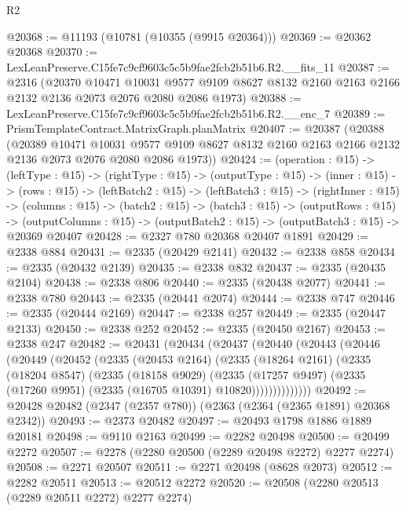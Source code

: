 \begin{lexlean}{R2}
\begin{coremodule}
@20368 := @11193 (@10781 (@10355 (@9915 @20364)))
@20369 := @20362 @20368
@20370 := LexLeanPreserve.C15fe7c9cf9603c5c5b9fae2fcb2b51b6.R2.__fits_11
@20387 := @2316
    (@20370
      @10471
      @10031
      @9577
      @9109
      @8627
      @8132
      @2160
      @2163
      @2166
      @2132
      @2136
      @2073
      @2076
      @2080
      @2086
      @1973)
@20388 := LexLeanPreserve.C15fe7c9cf9603c5c5b9fae2fcb2b51b6.R2.__enc_7
@20389 := PrismTemplateContract.MatrixGraph.planMatrix
@20407 := @20387
    (@20388
      (@20389
        @10471
        @10031
        @9577
        @9109
        @8627
        @8132
        @2160
        @2163
        @2166
        @2132
        @2136
        @2073
        @2076
        @2080
        @2086
        @1973))
@20424 := (operation : @15) ->
  (leftType : @15) ->
  (rightType : @15) ->
  (outputType : @15) ->
  (inner : @15) ->
  (rows : @15) ->
  (leftBatch2 : @15) ->
  (leftBatch3 : @15) ->
  (rightInner : @15) ->
  (columns : @15) ->
  (batch2 : @15) ->
  (batch3 : @15) ->
  (outputRows : @15) ->
  (outputColumns : @15) -> (outputBatch2 : @15) -> (outputBatch3 : @15) -> @20369 @20407
@20428 := @2327 @780 @20368 @20407 @1891
@20429 := @2338 @884
@20431 := @2335 (@20429 @2141)
@20432 := @2338 @858
@20434 := @2335 (@20432 @2139)
@20435 := @2338 @832
@20437 := @2335 (@20435 @2104)
@20438 := @2338 @806
@20440 := @2335 (@20438 @2077)
@20441 := @2338 @780
@20443 := @2335 (@20441 @2074)
@20444 := @2338 @747
@20446 := @2335 (@20444 @2169)
@20447 := @2338 @257
@20449 := @2335 (@20447 @2133)
@20450 := @2338 @252
@20452 := @2335 (@20450 @2167)
@20453 := @2338 @247
@20482 := @20431
    (@20434
      (@20437
        (@20440
          (@20443
            (@20446
              (@20449
                (@20452
                  (@2335
                    (@20453 @2164)
                    (@2335
                      (@18264 @2161)
                      (@2335
                        (@18204 @8547)
                        (@2335
                          (@18158 @9029)
                          (@2335
                            (@17257 @9497)
                            (@2335 (@17260 @9951) (@2335 (@16705 @10391) @10820))))))))))))))
@20492 := @20428 @20482 (@2347 (@2357 @780)) (@2363 (@2364 (@2365 @1891) @20368 @2342))
@20493 := @2373 @20482
@20497 := @20493 @1798 @1886 @1889 @20181
@20498 := @9110 @2163
@20499 := @2282 @20498
@20500 := @20499 @2272
@20507 := @2278 (@2280 @20500 (@2289 @20498 @2272) @2277 @2274)
@20508 := @2271 @20507
@20511 := @2271 @20498 (@8628 @2073)
@20512 := @2282 @20511
@20513 := @20512 @2272
@20520 := @20508 (@2280 @20513 (@2289 @20511 @2272) @2277 @2274)

\end{coremodule}
\end{lexlean}
